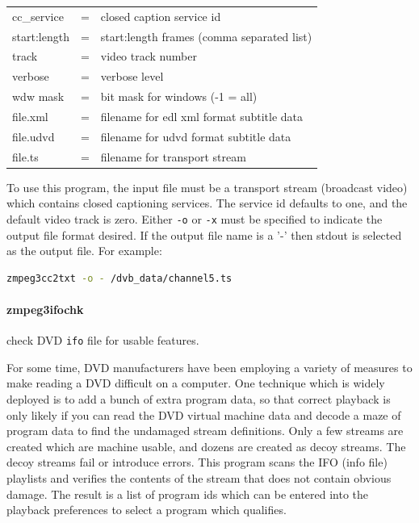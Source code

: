 \begin{tabular}{lcl}
    cc\_service&=&closed caption service id\\
    
    start:length&=&start:length frames (comma separated list)\\
    
    track&=&video track number\\
    
    verbose&=&verbose level\\
    
    wdw mask&=&bit mask for windows (-1 = all)\\
    
    file.xml&=&filename for edl xml format subtitle data\\
    
    file.udvd&=&filename for udvd format subtitle data\\
    
    file.ts&=&filename for transport stream\\    
\end{tabular}

To use this program, the input file must be a transport stream (broadcast video) which contains closed captioning services.  The service id defaults to one, and the default video track is zero.  Either \texttt{-o} or \texttt{-x} must be specified to indicate the output file format desired.  If the output file name is a '-' then stdout is selected as the output file. 
For example:

\begin{lstlisting}[language=bash]
zmpeg3cc2txt -o - /dvb_data/channel5.ts
\end{lstlisting}

\paragraph{zmpeg3ifochk} check DVD \texttt{ifo} file for usable features.

For some time, DVD manufacturers have been employing  a variety of measures to make reading a DVD difficult on a computer.  One technique which is widely deployed is to add a bunch of extra program data, so that correct playback is only likely if you can read the DVD virtual machine data and decode a maze of program data to find the undamaged stream definitions.  Only a few streams are created which are machine usable, and dozens are created as decoy streams.  The decoy streams fail or introduce errors.  This program scans the IFO (info file) playlists and verifies the contents of the stream that does not contain obvious damage.  The result is a list of program ids which can be entered into the playback preferences to select a program which qualifies.

